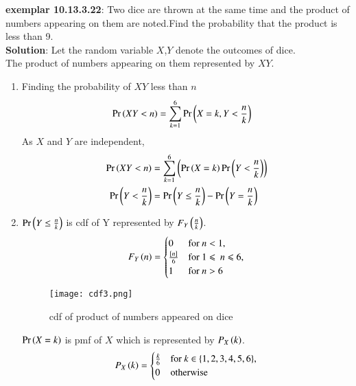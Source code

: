\documentclass[journal,12pt,onecolumn]{IEEEtran}
\begin{document}
 \bigskip 
 \renewcommand{\thefigure}{\theenumi} 
 \renewcommand{\thetable}{\theenumi} 
 \textbf{exemplar 10.13.3.22}: 
 Two dice are thrown at the same time and the product of numbers appearing on them are noted.Find the probability that the product is less than 9. \\ 
 \textbf{Solution}: 
         Let the random variable  $X$,$Y$ denote the outcomes of dice. \\
	 The product of numbers appearing on them represented by $XY$. \\
 \begin{enumerate}[label=(\alph*)] 
	 \item   Finding the probability of $XY$ less than $n$ 
                         \begin{align} 
				 \Pr\left(XY < n\right) &=\sum_{k=1}^{6}\Pr\left(X=k,Y < \frac{n}{k}\right)   
                         \end{align} 
		 As $X$ and $Y$ are independent,
			 \begin{align}
				 \Pr\left(XY < n\right) &= \sum_{k=1}^{6}\left(\Pr\left(X=k\right)\Pr\left(Y < \frac{n}{k}\right)\right) \\
                                 \Pr\left(Y < \frac{n}{k}\right) &= \Pr\left(Y \leq \frac{n}{k}\right) - \Pr\left(Y = \frac{n}{k}\right)
			 \end{align}
			 \item $\Pr\left(Y \leq \frac{n}{k}\right)$ is cdf of Y represented by $F_Y\left(\frac{n}{k}\right)$.\\
                        \begin{align}
                                F_Y\left(n\right) = \begin{cases} 0 & \text{for $n < 1$}, \\ \frac{{}\left[n\right]}{6} & \text{for } 1 \leqslant\: n \leqslant 6 ,\\ 1 & \text{for $n > 6$} \end{cases}
                        \end{align}
			\begin{figure}
				\captionsetup{width=\columnwidth}
				\texttt{[image: cdf3.png]}
				\caption{cdf of product of numbers appeared on dice}
				\label{fig:cdf3}
			\end{figure}
			$\Pr\left(X=k\right)$ is pmf of $X$ which is represented by $P_X\left(k\right)$.
                         \begin{align}
				 P_X\brak{k} =\begin{cases} \frac{k}{6}  & \text{for $k \in \{1,2,3,4,5,6\}$}, \\ 0 & \text{otherwise} \end{cases} 

\end{align}
\end{enumerate}
\end{document}
